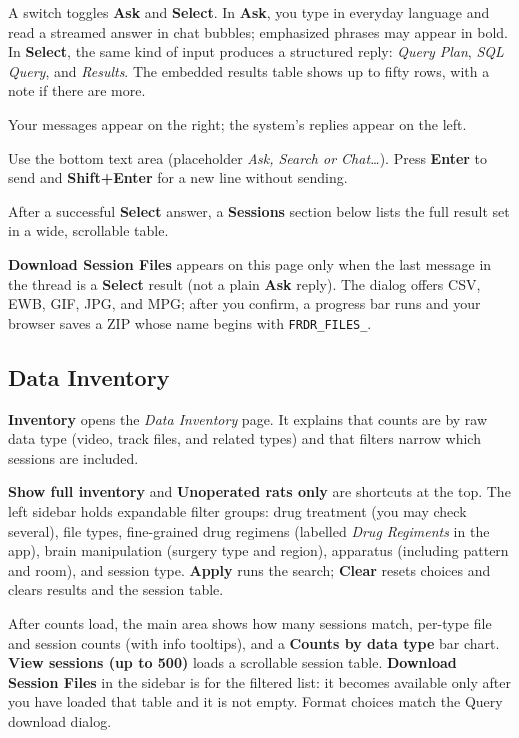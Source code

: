 \documentclass{article}
\begin{document}
A switch toggles \textbf{Ask} and \textbf{Select}. In \textbf{Ask}, you type in everyday language and read a streamed answer in chat bubbles; emphasized phrases may appear in bold. In \textbf{Select}, the same kind of input produces a structured reply: \emph{Query Plan}, \emph{SQL Query}, and \emph{Results}. The embedded results table shows up to fifty rows, with a note if there are more.

Your messages appear on the right; the system's replies appear on the left.

Use the bottom text area (placeholder \emph{Ask, Search or Chat\ldots}). Press \textbf{Enter} to send and \textbf{Shift+Enter} for a new line without sending.

After a successful \textbf{Select} answer, a \textbf{Sessions} section below lists the full result set in a wide, scrollable table.

\textbf{Download Session Files} appears on this page only when the last message in the thread is a \textbf{Select} result (not a plain \textbf{Ask} reply). The dialog offers CSV, EWB, GIF, JPG, and MPG; after you confirm, a progress bar runs and your browser saves a ZIP whose name begins with \texttt{FRDR\_FILES\_}.

\subsection{Data Inventory}
\label{subsec:inventory-overview}

\textbf{Inventory} opens the \emph{Data Inventory} page. It explains that counts are by raw data type (video, track files, and related types) and that filters narrow which sessions are included.

\textbf{Show full inventory} and \textbf{Unoperated rats only} are shortcuts at the top. The left sidebar holds expandable filter groups: drug treatment (you may check several), file types, fine-grained drug regimens (labelled \emph{Drug Regiments} in the app), brain manipulation (surgery type and region), apparatus (including pattern and room), and session type. \textbf{Apply} runs the search; \textbf{Clear} resets choices and clears results and the session table.

After counts load, the main area shows how many sessions match, per-type file and session counts (with info tooltips), and a \textbf{Counts by data type} bar chart. \textbf{View sessions (up to 500)} loads a scrollable session table. \textbf{Download Session Files} in the sidebar is for the filtered list: it becomes available only after you have loaded that table and it is not empty. Format choices match the Query download dialog.
\end{document}
